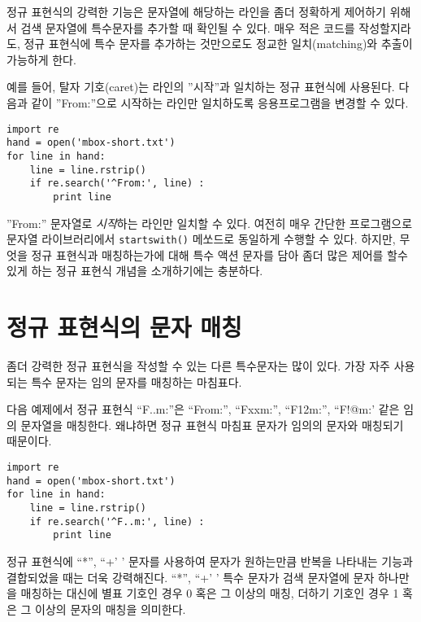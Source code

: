 정규 표현식의 강력한 기능은 문자열에 해당하는 라인을 좀더 정확하게 제어하기 위해서 검색 문자열에 특수문자를 추가할 때 확인될 수 있다.
매우 적은 코드를 작성할지라도, 정규 표현식에 특수 문자를 추가하는 것만으로도 정교한 일치(matching)와 추출이 가능하게 한다.

예를 들어, 탈자 기호(caret)는 라인의 ''시작''과 일치하는 정규 표현식에 사용된다.
다음과 같이 ''From:''으로 시작하는 라인만 일치하도록 응용프로그램을 변경할 수 있다.

\beforeverb
\begin{verbatim}
import re
hand = open('mbox-short.txt')
for line in hand:
    line = line.rstrip()
    if re.search('^From:', line) :
        print line
\end{verbatim}
\afterverb
%

''From:'' 문자열로 {\em 시작}하는 라인만 일치할 수 있다. 
여전히 매우 간단한 프로그램으로 문자열 라이브러리에서  {\tt startswith()} 메쏘드로 동일하게 수행할 수 있다.
하지만, 무엇을 정규 표현식과 매칭하는가에 대해 특수 액션 문자를 담아 좀더 많은 제어를 할수 있게 하는 정규 표현식 개념을 소개하기에는 충분하다.


\section{정규 표현식의 문자 매칭}

좀더 강력한 정규 표현식을 작성할 수 있는 다른 특수문자는 많이 있다.
가장 자주 사용되는 특수 문자는 임의 문자를 매칭하는 마침표다.


다음 예제에서 정규 표현식 ``F..m:''은 ``From:'', ``Fxxm:'', ``F12m:'', ``F!@m:' 같은 임의 문자열을 매칭한다. 
왜냐하면 정규 표현식 마침표 문자가 임의의 문자와 매칭되기 때문이다.

\beforeverb
\begin{verbatim}
import re
hand = open('mbox-short.txt')
for line in hand:
    line = line.rstrip()
    if re.search('^F..m:', line) :
        print line
\end{verbatim}
\afterverb
%

정규 표현식에 ``*'', ``+' ' 문자를 사용하여 문자가 원하는만큼 반복을 나타내는 기능과 결합되었을 때는 더욱 강력해진다.
``*'', ``+' ' 특수 문자가 검색 문자열에 문자 하나만을 매칭하는 대신에 별표 기호인 경우 0 혹은 그 이상의 매칭, 더하기 기호인 경우 1 혹은 그 이상의 문자의 매칭을 의미한다.

